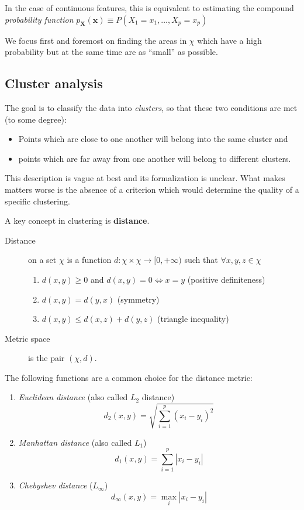 \documentclass[a4paper]{article}
\begin{document}
	In the case of continuous features, this is equivalent to estimating the compound
	\textit{probability function} $p_{\boldsymbol{X}}(\boldsymbol{x}) \equiv P(X_1 = x_1, \ldots, X_p = x_p)$

	We focus first and foremost on finding the areas in $\chi$ which have a high probability
	but at the same time are as \enquote{small} as possible.

	\subsection{Cluster analysis}
	The goal is to classify the data into \textit{clusters}, so that these two
	conditions are met (to some degree):
	\begin{itemize}
		\item Points which are close to one another will belong into the same cluster and
		\item points which are far away from one another will belong to different clusters.
	\end{itemize}

	This description is vague at best and its formalization is unclear. What makes matters
	worse is the absence of a criterion which would determine the quality of a specific
	clustering.

	A key concept in clustering is \textbf{distance}.


	\begin{description}
		\item[Distance] on a set $\chi$ is a function $d: \chi \times \chi \longrightarrow [0, +\infty)$
			such that $\forall x, y, z \in \chi$
			\begin{enumerate}
				\item $d(x, y) \ge 0$ and $d(x, y) = 0 \iff x = y$ (positive definiteness)
				\item $d(x, y) = d(y, x)$ (symmetry)
				\item $d(x, y) \le d(x, z) + d(y, z)$ (triangle inequality)
			\end{enumerate}
		\item[Metric space] is the pair $(\chi, d)$.
	\end{description}

	The following functions are a common choice for the distance metric:
	\begin{enumerate}
		\item \textit{Euclidean distance} (also called $L_2$ distance)
			$$d_2(x, y) = \sqrt{\sum_{i=1}^{p} \left( x_i - y_i \right)^2}$$
		\item \textit{Manhattan distance} (also called $L_1$)
			$$d_1(x, y) = \sum_{i=1}^{p} |x_i - y_i|$$
		\item \textit{Chebyshev distance} ($L_\infty$)
			$$d_\infty(x, y) = \max_i |x_i - y_i|$$
	\end{enumerate}
\end{document}
